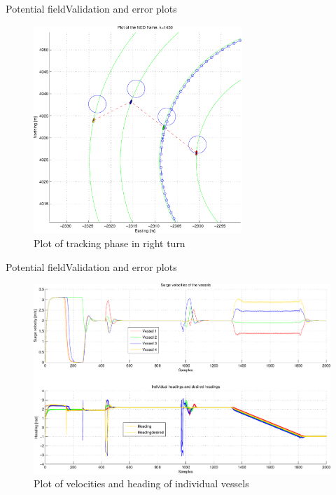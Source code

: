 \documentclass[10pt,handout]{beamer}
\begin{document}
\begin{frame}{Potential field}{Validation and error plots}
  \begin{figure}
    \includegraphics[width=0.7\textwidth]{img/pdfsvingstykke}
    \caption{Plot of tracking phase in right turn}
  \end{figure}
\end{frame}

\begin{frame}{Potential field}{Validation and error plots}
  \begin{figure}
    \includegraphics[width=\textwidth]{img/pdfveloghead}
    \caption{Plot of velocities and heading of individual vessels}
  \end{figure}
\end{frame}
\end{document}

